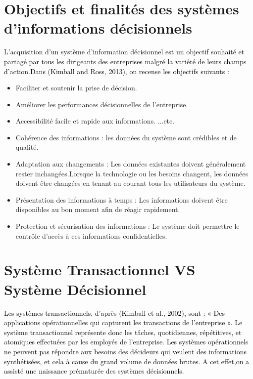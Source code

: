 \documentclass[a4paper,12pt]{report}
\begin{document}
\section{Objectifs et finalités des systèmes d’informations décisionnels}

\textcolor{black}{L’acquisition d’un système d’information décisionnel est un objectif souhaité et partagé
par tous les dirigeants des entreprises malgré la variété de leurs champs d’action.Dans (Kimball and Ross, 2013), on recense les objectifs suivants : }

\begin{itemize}
	\item  Faciliter et soutenir la prise de décision.
	\item  Améliorer les performances décisionnelles de l’entreprise.
	\item  Accessibilité facile et rapide aux informations. ...etc.
	\item  Cohérence des informations : les  données du système sont crédibles et de qualité.
	\item Adaptation aux changements : Les données existantes doivent généralement rester inchangées.Lorsque la technologie ou les besoins changent, les données doivent être changées en tenant au courant tous les utilisateurs du système.
	\item Présentation des informations à temps : Les informations doivent être disponibles au bon moment afin de réagir rapidement.
	\item Protection et sécurisation des informations : Le système doit permettre le contrôle d’accès à ces informations confidentielles.
	
\end{itemize}

\section{Système Transactionnel VS Système Décisionnel}
\textcolor{black}{Les systèmes transactionnels, d’après (Kimball et al., 2002), sont : « Des applications opérationnelles qui capturent les transactions de l’entreprise ».
Le système transactionnel représente donc les tâches, quotidiennes, répétitives, et atomiques effectuées par les employés de l’entreprise.
Les systèmes opérationnels ne peuvent pas répondre aux besoins des décideurs qui veulent des informations synthétisées, et cela à cause du grand volume de données brutes.
A cet effet,on a assisté une naissance prématurée des systèmes décisionnels.}
\end{document}

